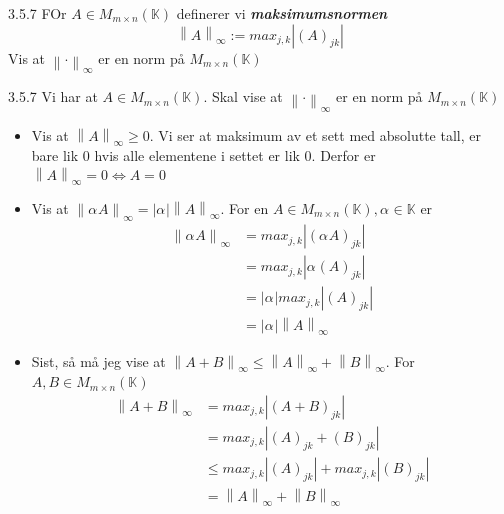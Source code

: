 \documentclass[a4paper,norsk]{article}
\renewcommand{\geq}{\geqslant}
\renewcommand{\leq}{\leqslant}
\begin{document}
\begin{oppgavebox}{3.5.7}{}
FOr $ A \in  M_{m \times n} (\mathbb{K}) $ definerer vi \textbf{\textit{maksimumsnormen}}
\[
    \left\lVert A \right\rVert _{\infty} := max _{j, k} \left| \left( A \right) _{jk} \right| 
\]
Vis at $ \left\lVert \cdot \right\rVert _{\infty} $ er en norm på $ M_{m \times n} (\mathbb{K}) $ 

\begin{proofbox}{3.5.7}{}
Vi har at $ A \in M_{m \times n} (\mathbb{K}) $. Skal vise at $ \left\lVert \cdot    \right\rVert_{\infty}  $ er en norm på $ M_{m \times n} (\mathbb{K}) $ 

\begin{itemize}
    \item Vis at $ \left\lVert A \right\rVert _{\infty} \geq 0 $. Vi ser at maksimum av et sett med absolutte tall, er bare lik 0 hvis alle elementene i settet er lik 0. Derfor er $ \left\lVert A \right\rVert _{\infty} = 0 \iff A = 0 $ 
    \item Vis at $ \left\lVert \alpha_{}^{} A \right\rVert _{\infty} = \left| \alpha_{}^{}  \right| \left\lVert A \right\rVert _{\infty} $. For en $ A \in  M_{m \times n} (\mathbb{K}), \alpha_{}^{} \in \mathbb{K} $ er
    \begin{align*}
        \left\lVert \alpha_{}^{} A \right\rVert _{\infty} &= max_{j, k} \left| \left( \alpha_{}^{} A \right) _{jk} \right| \\
        &= max_{j, k} \left| \alpha_{}^{} \left( A \right) _{jk} \right| \\
        &= \left| \alpha_{}^{}  \right| max_{j, k} \left| \left( A \right)_{jk}  \right| \\
        &= \left| \alpha_{}^{}  \right| \left\lVert A \right\rVert _{\infty}
    \end{align*}
    \item Sist, så må jeg vise at $ \left\lVert A + B \right\rVert _{\infty} \leq \left\lVert A \right\rVert _{\infty} + \left\lVert B \right\rVert _{\infty} $. For $ A, B \in M_{m \times n} (\mathbb{K}) $ 
    \begin{align*}
        \left\lVert A+ B \right\rVert _{\infty} &= max_{j, k} \left| \left( A + B \right) _{jk} \right| \\
        &= max_{j, k} \left| \left( A \right) _{jk} + \left( B \right) _{jk} \right|  \\
        &\leq max_{j, k} \left| \left( A \right) _{jk} \right| + max_{j, k} \left| \left( B \right)_{jk}  \right| \\
        &= \left\lVert A \right\rVert _{\infty} + \left\lVert B \right\rVert _{\infty}
    \end{align*}
\end{itemize}
\end{proofbox}
\end{oppgavebox}
\end{document}
